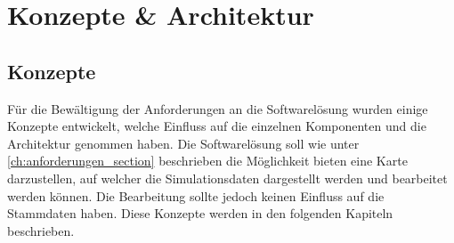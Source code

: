 \chapter{Konzepte \& Architektur}
\label{ch:konzepte_architektur}
\section{Konzepte}
Für die Bewältigung der Anforderungen an die Softwarelösung wurden einige Konzepte entwickelt, welche Einfluss auf die einzelnen Komponenten und die Architektur genommen haben. Die Softwarelösung soll wie unter \ref{ch:anforderungen_section}  beschrieben die Möglichkeit bieten eine Karte darzustellen, auf welcher die Simulationsdaten dargestellt werden und bearbeitet werden können. Die Bearbeitung sollte jedoch keinen Einfluss auf die Stammdaten haben. Diese Konzepte werden in den folgenden Kapiteln beschrieben.
